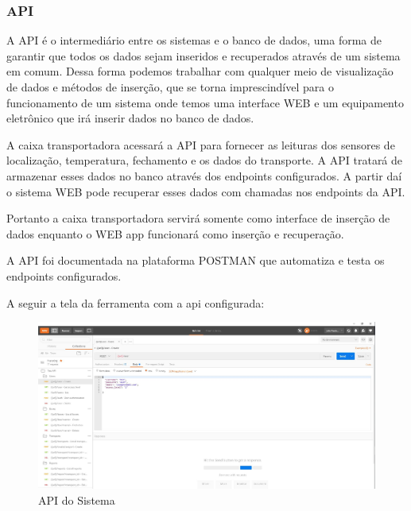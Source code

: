 \subsubsection{API}

A API é o intermediário entre os sistemas e o banco de dados, uma forma de garantir que todos os dados sejam inseridos e recuperados através de um sistema em comum. Dessa forma podemos trabalhar com qualquer meio de visualização de dados e métodos de inserção, que se torna imprescindível para o funcionamento de um sistema onde temos uma interface WEB e um equipamento eletrônico que irá inserir dados no banco de dados.

A caixa transportadora acessará a API para fornecer as leituras dos sensores de localização, temperatura, fechamento e os dados do transporte. A API tratará de armazenar esses dados no banco através dos endpoints configurados. A partir daí o sistema WEB pode recuperar esses dados com chamadas nos endpoints da API. 

Portanto a caixa transportadora servirá somente como interface de inserção de dados enquanto o WEB app funcionará como inserção e recuperação.

A API foi documentada na plataforma POSTMAN que automatiza e testa os endpoints configurados. 

 A seguir a tela da ferramenta com a api configurada:

\begin{figure}[H]
\centering
\includegraphics[width=16cm]{figuras/api_software.jpg}
\caption{API do Sistema}
\end{figure}